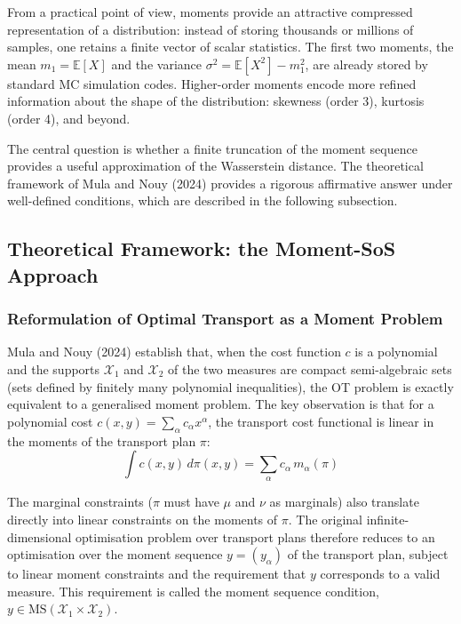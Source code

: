 \documentclass[12pt]{article}
\begin{document}
From a practical point of view, moments provide an attractive compressed
representation of a distribution: instead of storing thousands or millions of samples,
one retains a finite vector of scalar statistics. The first two moments, the mean
$m_1 = \mathbb{E}[X]$ and the variance $\sigma^2 = \mathbb{E}[X^2] - m_1^2$, are
already stored by standard MC simulation codes. Higher-order moments encode more
refined information about the shape of the distribution: skewness (order 3),
kurtosis (order 4), and beyond.

The central question is whether a finite truncation of the moment sequence provides
a useful approximation of the Wasserstein distance. The theoretical framework of
Mula and Nouy (2024) provides a rigorous affirmative answer under well-defined
conditions, which are described in the following subsection.

\subsection{Theoretical Framework: the Moment-SoS Approach}

\subsubsection{Reformulation of Optimal Transport as a Moment Problem}

Mula and Nouy (2024) establish that, when the cost function $c$ is a polynomial and
the supports $\mathcal{X}_1$ and $\mathcal{X}_2$ of the two measures are compact
semi-algebraic sets (sets defined by finitely many polynomial inequalities), the OT
problem is exactly equivalent to a generalised moment problem. The key observation
is that for a polynomial cost $c(x,y) = \sum_\alpha c_\alpha x^\alpha$, the transport
cost functional is linear in the moments of the transport plan $\pi$:
\begin{equation}
    \int c(x,y) \, d\pi(x,y) = \sum_\alpha c_\alpha \, m_\alpha(\pi)
\end{equation}

The marginal constraints ($\pi$ must have $\mu$ and $\nu$ as marginals) also
translate directly into linear constraints on the moments of $\pi$. The original
infinite-dimensional optimisation problem over transport plans therefore reduces to
an optimisation over the moment sequence $y = (y_\alpha)$ of the transport plan,
subject to linear moment constraints and the requirement that $y$ corresponds to a
valid measure. This requirement is called the moment sequence condition,
$y \in \mathrm{MS}(\mathcal{X}_1 \times \mathcal{X}_2)$.
\end{document}
